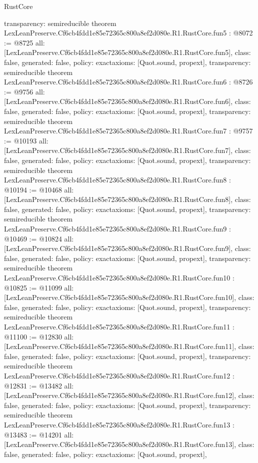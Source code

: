 \begin{lexlean}{RustCore}
\begin{coremodule}
{  transparency: semireducible
}
theorem LexLeanPreserve.Cf6cb4fdd1e85e72365c800a8ef2d080e.R1.RustCore.fun5 : @8072 := @8725 {
  all: [LexLeanPreserve.Cf6cb4fdd1e85e72365c800a8ef2d080e.R1.RustCore.fun5],
  class: false,
  generated: false,
  policy: exact{axioms: [Quot.sound, propext]},
  transparency: semireducible
}
theorem LexLeanPreserve.Cf6cb4fdd1e85e72365c800a8ef2d080e.R1.RustCore.fun6 : @8726 := @9756 {
  all: [LexLeanPreserve.Cf6cb4fdd1e85e72365c800a8ef2d080e.R1.RustCore.fun6],
  class: false,
  generated: false,
  policy: exact{axioms: [Quot.sound, propext]},
  transparency: semireducible
}
theorem LexLeanPreserve.Cf6cb4fdd1e85e72365c800a8ef2d080e.R1.RustCore.fun7 : @9757 := @10193 {
  all: [LexLeanPreserve.Cf6cb4fdd1e85e72365c800a8ef2d080e.R1.RustCore.fun7],
  class: false,
  generated: false,
  policy: exact{axioms: [Quot.sound, propext]},
  transparency: semireducible
}
theorem LexLeanPreserve.Cf6cb4fdd1e85e72365c800a8ef2d080e.R1.RustCore.fun8 : @10194 := @10468 {
  all: [LexLeanPreserve.Cf6cb4fdd1e85e72365c800a8ef2d080e.R1.RustCore.fun8],
  class: false,
  generated: false,
  policy: exact{axioms: [Quot.sound, propext]},
  transparency: semireducible
}
theorem LexLeanPreserve.Cf6cb4fdd1e85e72365c800a8ef2d080e.R1.RustCore.fun9 : @10469 := @10824 {
  all: [LexLeanPreserve.Cf6cb4fdd1e85e72365c800a8ef2d080e.R1.RustCore.fun9],
  class: false,
  generated: false,
  policy: exact{axioms: [Quot.sound, propext]},
  transparency: semireducible
}
theorem LexLeanPreserve.Cf6cb4fdd1e85e72365c800a8ef2d080e.R1.RustCore.fun10 : @10825 := @11099 {
  all: [LexLeanPreserve.Cf6cb4fdd1e85e72365c800a8ef2d080e.R1.RustCore.fun10],
  class: false,
  generated: false,
  policy: exact{axioms: [Quot.sound, propext]},
  transparency: semireducible
}
theorem LexLeanPreserve.Cf6cb4fdd1e85e72365c800a8ef2d080e.R1.RustCore.fun11 : @11100 := @12830 {
  all: [LexLeanPreserve.Cf6cb4fdd1e85e72365c800a8ef2d080e.R1.RustCore.fun11],
  class: false,
  generated: false,
  policy: exact{axioms: [Quot.sound, propext]},
  transparency: semireducible
}
theorem LexLeanPreserve.Cf6cb4fdd1e85e72365c800a8ef2d080e.R1.RustCore.fun12 : @12831 := @13482 {
  all: [LexLeanPreserve.Cf6cb4fdd1e85e72365c800a8ef2d080e.R1.RustCore.fun12],
  class: false,
  generated: false,
  policy: exact{axioms: [Quot.sound, propext]},
  transparency: semireducible
}
theorem LexLeanPreserve.Cf6cb4fdd1e85e72365c800a8ef2d080e.R1.RustCore.fun13 : @13483 := @14201 {
  all: [LexLeanPreserve.Cf6cb4fdd1e85e72365c800a8ef2d080e.R1.RustCore.fun13],
  class: false,
  generated: false,
  policy: exact{axioms: [Quot.sound, propext]},
}
\end{coremodule}
\end{lexlean}
